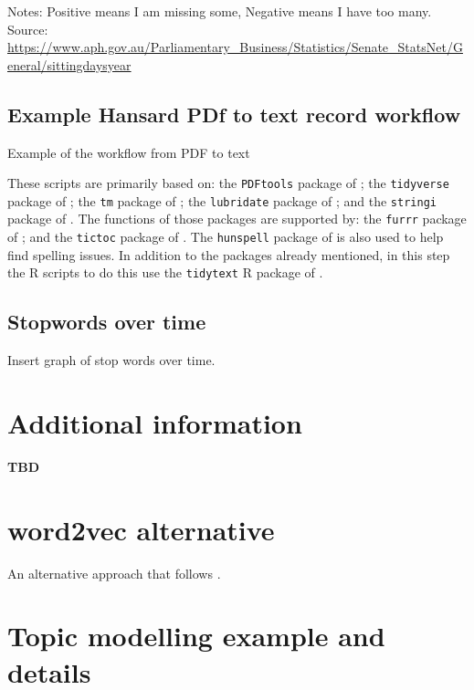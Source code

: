 \documentclass[12pt,]{article}
\theoremstyle{definition}
\theoremstyle{definition}
\theoremstyle{definition}
\theoremstyle{remark}
\begin{document}
Notes: Positive means I am missing some, Negative means I have too many.
Source:
\url{https://www.aph.gov.au/Parliamentary_Business/Statistics/Senate_StatsNet/General/sittingdaysyear}

\subsection{Example Hansard PDf to text record
workflow}\label{hansardworkflow}

Example of the workflow from PDF to text

These scripts are primarily based on: the \texttt{PDFtools} package of
\citet{Ooms2018pdftools}; the \texttt{tidyverse} package of
\citet{Wickham2017}; the \texttt{tm} package of
\citet{FeinererHornik2018}; the \texttt{lubridate} package of
\citet{GrolemundWickham2011}; and the \texttt{stringi} package of
\citet{Gagolewski2018}. The functions of those packages are supported
by: the \texttt{furrr} package of \citet{VaughanDancho2018}; and the
\texttt{tictoc} package of \citet{Izrailev2014}. The \texttt{hunspell}
package of \citet{Ooms2017} is also used to help find spelling issues.
In addition to the packages already mentioned, in this step the R
scripts to do this use the \texttt{tidytext} R package of
\citet{SilgeRobinson2016}.

\subsection{Stopwords over time}\label{stopwordsgraph}

Insert graph of stop words over time.

\newpage

\section{Additional information}\label{additionalinformation}

\textbf{TBD}

\newpage

\section{word2vec alternative}\label{word2vec}

An alternative approach that follows \citet{Taddy2015}.

\newpage

\section{Topic modelling example and
details}\label{topic-modelling-example-and-details}
\end{document}
